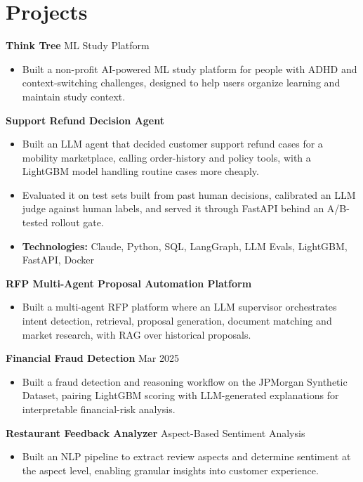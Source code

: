 \documentclass[10pt,a4paper]{article}
\begin{document}
\section{Projects}
\textbf{Think Tree} \textbar{} ML Study Platform\par
\begin{itemize}
  \item Built a non-profit AI-powered ML study platform for people with ADHD and context-switching challenges, designed to help users organize learning and maintain study context.
\end{itemize}
\textbf{Support Refund Decision Agent}\par
\begin{itemize}
  \item Built an LLM agent that decided customer support refund cases for a mobility marketplace, calling order-history and policy tools, with a LightGBM model handling routine cases more cheaply.
  \item Evaluated it on test sets built from past human decisions, calibrated an LLM judge against human labels, and served it through FastAPI behind an A/B-tested rollout gate.
  \item \textbf{Technologies:} Claude, Python, SQL, LangGraph, LLM Evals, LightGBM, FastAPI, Docker
\end{itemize}
\textbf{RFP Multi-Agent Proposal Automation Platform}\par
\begin{itemize}
  \item Built a multi-agent RFP platform where an LLM supervisor orchestrates intent detection, retrieval, proposal generation, document matching and market research, with RAG over historical proposals.
\end{itemize}
\textbf{Financial Fraud Detection} \textbar{} Mar 2025\par
\begin{itemize}
  \item Built a fraud detection and reasoning workflow on the JPMorgan Synthetic Dataset, pairing LightGBM scoring with LLM-generated explanations for interpretable financial-risk analysis.
\end{itemize}
\textbf{Restaurant Feedback Analyzer} \textbar{} Aspect-Based Sentiment Analysis\par
\begin{itemize}
  \item Built an NLP pipeline to extract review aspects and determine sentiment at the aspect level, enabling granular insights into customer experience.
\end{itemize}
\end{document}
